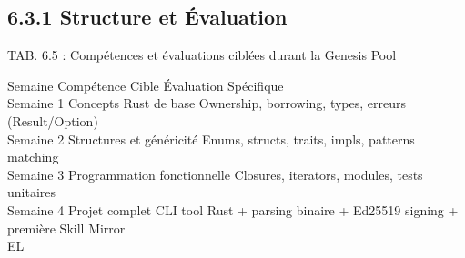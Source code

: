 \subsection{6.3.1 Structure et Évaluation}
\vspace{0.5em}
\vspace{0.5em}
\begin{center}\begin{tabular}TAB. 6.5 : Compétences et évaluations ciblées durant la Genesis Pool\end{tabular}\end{center}
\vspace{0.5em}
\vspace{0.5em}
Semaine       Compétence Cible                 Évaluation Spécifique\\
Semaine 1     Concepts Rust de base            Ownership, borrowing, types, erreurs (Result/Option)\\
Semaine 2     Structures et généricité         Enums, structs, traits, impls, patterns matching\\
Semaine 3     Programmation fonctionnelle      Closures, iterators, modules, tests unitaires\\
Semaine 4     Projet complet                   CLI tool Rust + parsing binaire + Ed25519 signing + première Skill Mirror\\
\vspace{0.5em}
\vspace{0.5em}
\vspace{0.5em}
\vspace{0.5em}
EL\\
